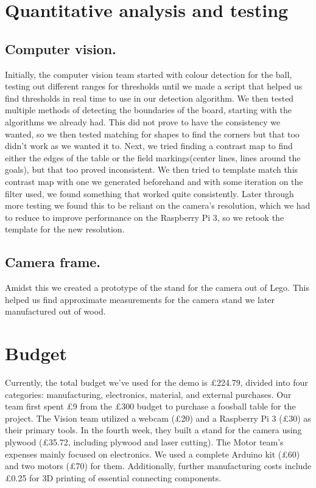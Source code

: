\documentclass{article}
\begin{document}
\section{Quantitative analysis and testing}
\subsection{Computer vision.}
Initially, the computer vision team started with colour detection for the ball, testing out different ranges for thresholds until we made a script that helped us find thresholds in real time to use in our detection algorithm. We then tested multiple methods of detecting the boundaries of the board, starting with the algorithms we already had. This did not prove to have the consistency we wanted, so we then tested matching for shapes to find the corners but that too didn't work as we wanted it to. Next, we tried finding a contrast map to find either the edges of the table or the field markings(center lines, lines around the goals), but that too proved inconsistent. We then tried to template match this contrast map with one we generated beforehand and with some iteration on the filter used, we found something that worked quite consistently. Later through more testing we found this to be reliant on the camera's resolution, which we had to reduce to improve performance on the Raspberry Pi 3, so we retook the template for the new resolution.

\subsection{Camera frame.}
Amidst this we created a prototype of the stand for the camera out of Lego. This helped us find approximate measurements for the camera stand we later manufactured out of wood.

\section{Budget}
Currently, the total budget we've used for the demo is £224.79, divided into four categories: manufacturing, electronics, material, and external purchases. Our team first spent £9 from the £300 budget to purchase a foosball table for the project. The Vision team utilized a webcam (£20) and a Raspberry Pi 3 (£30) as their primary tools. In the fourth week, they built a stand for the camera using plywood (£35.72, including plywood and laser cutting). The Motor team's expenses mainly focused on electronics. We used a complete Arduino kit (£60) and two motors (£70) for them. Additionally, further manufacturing costs include £0.25 for 3D printing of essential connecting components.
\end{document}
